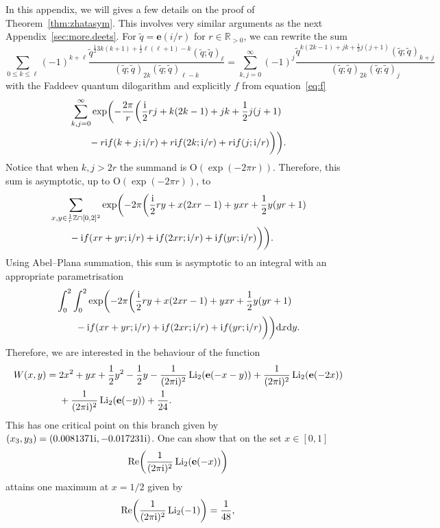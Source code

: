 \documentclass[pdftex]{sigma}
\numberwithin{equation}{section}
\def\BZ{\mathbb{Z}}
\def\BR{\mathbb{R}}
\def\tq{\tilde{q}}
\def\Li{\mathrm{Li}}
\def\e{\mathbf e}
\def\BZ{\mathbb Z}
\def\BR{\mathbb R}
\def\tq{\tilde{q}}
\def\Li{\operatorname{Li}}
\def\Re{\operatorname{Re}}
\begin{document}
In this appendix, we will gives a few details on the proof of Theorem~\ref{thm:zhatasym}.
This involves very similar arguments as the next Appendix~\ref{sec:more.deets}.
For $\tq=\e(i/r)$ for $r\in\BR_{>0}$, we can rewrite the sum
\[
 \sum_{0\leq k\leq\ell}(-1)^{k+\ell}\frac{\tq^{\frac{1}{2}3k(k+1)+\frac{1}{2}\ell(\ell+1)-k}(\tq;\tq)_{\ell}}{(\tq;\tq)_{2k}(\tq;\tq)_{\ell-k}}
  =
 \sum_{k,j=0}^{\infty}(-1)^{j}\frac{\tq^{k(2k-1)+jk+\frac{1}{2}j(j+1)}(\tq;\tq)_{k+j}}{(\tq;\tq)_{2k}(\tq;\tq)_{j}}
\]
with the Faddeev quantum dilogarithm and explicitly $f$ from equation~\eqref{eq:f}
\begin{align*}
& \sum_{k,j=0}^{\infty}
 \exp\biggl(-\frac{2\pi}{r}\biggl(\frac{{\rm i}}{2}rj+k(2k-1)+jk+\frac{1}{2}j(j+1)\\
& \qquad{}-r{\rm i}f(k+j;{\rm i}/r)+r{\rm i}f(2k;{\rm i}/r)+r{\rm i}f(j;{\rm i}/r)\biggr)\biggr) .
\end{align*}
Notice that when $k,j>2r$ the summand is $\mathrm{O}(\exp(-2\pi r))$. Therefore, this sum is asymptotic, up to $\mathrm{O}(\exp(-2\pi r))$, to
\begin{align*}
&\sum_{x,y\in\frac{1}{r}\BZ\cap[0,2]^2}
 \exp\biggl(-2\pi\biggl(\frac{{\rm i}}{2}ry+x(2xr-1)+yxr+\frac{1}{2}y(yr+1)\\
& \qquad{}-{\rm i}f(xr+yr;{\rm i}/r)+{\rm i}f(2xr;{\rm i}/r)+{\rm i}f(yr;{\rm i}/r)\biggr)\biggr) .
\end{align*}
Using Abel--Plana summation, this sum is asymptotic to an integral with an appropriate para\-metri\-sa\-tion
\begin{align*}
 & \int_0^2\int_0^2
 \exp\biggl(-2\pi\biggl(\frac{{\rm i}}{2}ry+x(2xr-1)+yxr+\frac{1}{2}y(yr+1)\\
 &\qquad{} -{\rm i}f(xr+yr;{\rm i}/r)+{\rm i}f(2xr;{\rm i}/r)+{\rm i}f(yr;{\rm i}/r)\biggr)\biggr){\rm d}x{\rm d}y .
\end{align*}
Therefore, we are interested in the behaviour of the function
\begin{align*}
 W(x,y)
  ={}&
 2x^2+yx+\frac{1}{2}y^2-\frac{1}{2}y-\frac{1}{(2\pi {\rm i})^2}\Li_{2}(\e(-x-y))+\frac{1}{(2\pi {\rm i})^2}\Li_{2}(\e(-2x))\\
 &
 +\frac{1}{(2\pi {\rm i})^2}\Li_{2}(\e(-y))+\frac{1}{24} .
\end{align*}
This has one critical point on this branch given by $(x_3,y_3)=(0.0081371{\rm i},-0.017231{\rm i})$.
One can show that on the set $x\in[0,1]$
\[
 \Re\biggl(\frac{1}{(2\pi {\rm i})^2}\Li_{2}(\e(-x))\biggr)
\]
attains one maximum at $x=1/2$ given by
\[
 \Re\biggl(\frac{1}{(2\pi {\rm i})^2}\Li_{2}(-1)\biggr)
  =
 \frac{1}{48} ,
\]
\end{document}
